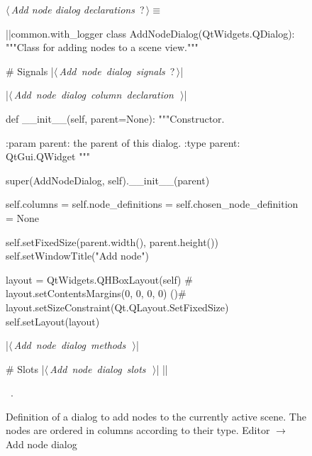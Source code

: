\documentclass[%
    a4paper,    %
    justified,  %
    nobib,      %
    openany     %
]{tufte-book}
\begin{document}
\begin{figure}
\begin{flushleft} \small
\begin{minipage}{\linewidth}\label{scrap148}\raggedright\small
{} $\langle\,${\itshape Add node dialog declarations}\nobreak\ {\footnotesize {?}}$\,\rangle\equiv$
\vspace{-1ex}
\begin{pythoncode}
|\normalfont{}\fontfamily{}|common.with_logger
class AddNodeDialog(QtWidgets.QDialog):
    """Class for adding nodes to a scene view."""

    # Signals
    |\hbox{$\langle\,${\itshape Add node dialog signals}\nobreak\ {\footnotesize ?}$\,\rangle$}|

    |\hbox{$\langle\,${\itshape Add node dialog column declaration}\nobreak\ {\footnotesize {}}$\,\rangle$}|

    def __init__(self, parent=None):
        """Constructor.

        :param parent: the parent of this dialog.
        :type  parent: QtGui.QWidget
        """

        super(AddNodeDialog, self).__init__(parent)

        self.columns                = {}
        self.node_definitions       = {}
        self.chosen_node_definition = None

        self.setFixedSize(parent.width(), parent.height())
        self.setWindowTitle("Add node")

        layout = QtWidgets.QHBoxLayout(self)
        # layout.setContentsMargins(0, 0, 0, 0)
        ()# layout.setSizeConstraint(Qt.QLayout.SetFixedSize)
        self.setLayout(layout)

    |\hbox{$\langle\,${\itshape Add node dialog methods}\nobreak\ {\footnotesize {}}$\,\rangle$}|

    # Slots
    |\hbox{$\langle\,${\itshape Add node dialog slots}\nobreak\ {\footnotesize {}}$\,\rangle$}|
|\NWsep|
\end{pythoncode}
\vspace{1.5ex}
\footnotesize
\begin{list}{}{\setlength{\itemsep}{-\parsep}\setlength{\itemindent}{-\leftmargin}}
\item \NWtxtMacroRefIn\ .

\item{}
\end{list}
\end{minipage}\vspace{4ex}
\end{flushleft}
\caption{Definition of a dialog to add nodes to the currently active scene. The
  nodes are ordered in columns according to their type.
  \newline{}\newline{}Editor $\rightarrow$ Add node dialog}
\label{editor:lst:add-node-dialog}
\end{figure}
\end{document}
